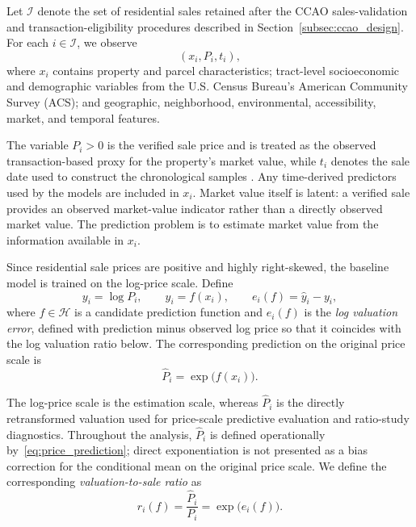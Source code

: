 \documentclass[10pt]{article}
\theoremstyle{definition}
\newcommand{\1}{\mathbf{1}}
\begin{document}
Let $\mathcal{I}$ denote the set of residential sales retained after the CCAO sales-validation and transaction-eligibility procedures described in Section~\ref{subsec:ccao_design}. For each $i\in\mathcal{I}$, we observe
\[
(x_i,P_i,t_i),
\]
where $x_i$ contains property and parcel characteristics; tract-level socioeconomic and demographic variables from the U.S. Census Bureau's American Community Survey (ACS); and geographic, neighborhood, environmental, accessibility, market, and temporal features.


{The variable $P_i>0$ is the verified sale price and is treated as the observed transaction-based proxy for the property's market value, while $t_i$ denotes the sale date used to construct the chronological samples \cite{CCAOModelResAVM2026,IAAO2026ExposureRatio}. Any time-derived predictors used by the models are included in $x_i$. Market value itself is latent: a verified sale provides an observed market-value indicator rather than a directly observed market value. The prediction problem is to estimate market value from the information available in $x_i$.}

Since residential sale prices are positive and highly right-skewed, the baseline model is trained on the log-price scale. Define
\begin{equation}
\label{eq:prediction_scale}
y_i=\log P_i,
\qquad
\widehat{y}_i=f(x_i),
\qquad
e_i(f)=\widehat{y}_i-y_i,
\end{equation}
{where $f\in\mathcal{H}$ is a candidate prediction function and $e_i(f)$ is the \emph{log valuation error}, defined with prediction minus observed log price so that it coincides with the log valuation ratio below.}
The corresponding prediction on the original price scale is
\begin{equation}
\label{eq:price_prediction}
\widehat{P}_i=\exp\bigl(f(x_i)\bigr).
\end{equation}


{The log-price scale is the estimation scale, whereas $\widehat{P}_i$ is the directly retransformed valuation used for price-scale predictive evaluation and ratio-study diagnostics. Throughout the analysis, $\widehat{P}_i$ is defined operationally by~\eqref{eq:price_prediction}; direct exponentiation is not presented as a bias correction for the conditional mean on the original price scale. We define the corresponding \emph{valuation-to-sale ratio} as}
\begin{equation}
\label{eq:valuation_ratio}
r_i(f)
=
\frac{\widehat{P}_i}{P_i}
=
\exp\bigl(e_i(f)\bigr).
\end{equation}
\end{document}
